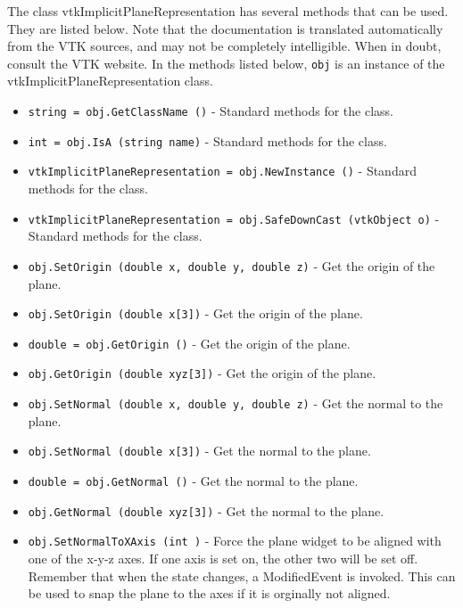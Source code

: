 The class vtkImplicitPlaneRepresentation has several methods that can be used.
  They are listed below.
Note that the documentation is translated automatically from the VTK sources,
and may not be completely intelligible.  When in doubt, consult the VTK website.
In the methods listed below, \verb|obj| is an instance of the vtkImplicitPlaneRepresentation class.
\begin{itemize}
\item  \verb|string = obj.GetClassName ()| -  Standard methods for the class.

\item  \verb|int = obj.IsA (string name)| -  Standard methods for the class.

\item  \verb|vtkImplicitPlaneRepresentation = obj.NewInstance ()| -  Standard methods for the class.

\item  \verb|vtkImplicitPlaneRepresentation = obj.SafeDownCast (vtkObject o)| -  Standard methods for the class.

\item  \verb|obj.SetOrigin (double x, double y, double z)| -  Get the origin of the plane.

\item  \verb|obj.SetOrigin (double x[3])| -  Get the origin of the plane.

\item  \verb|double = obj.GetOrigin ()| -  Get the origin of the plane.

\item  \verb|obj.GetOrigin (double xyz[3])| -  Get the origin of the plane.

\item  \verb|obj.SetNormal (double x, double y, double z)| -  Get the normal to the plane.

\item  \verb|obj.SetNormal (double x[3])| -  Get the normal to the plane.

\item  \verb|double = obj.GetNormal ()| -  Get the normal to the plane.

\item  \verb|obj.GetNormal (double xyz[3])| -  Get the normal to the plane.

\item  \verb|obj.SetNormalToXAxis (int )| -  Force the plane widget to be aligned with one of the x-y-z axes.
 If one axis is set on, the other two will be set off.
 Remember that when the state changes, a ModifiedEvent is invoked.
 This can be used to snap the plane to the axes if it is orginally
 not aligned.


\end{itemize}
